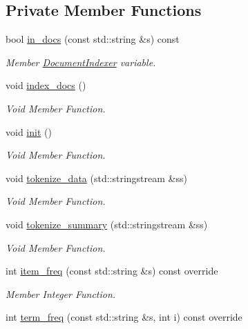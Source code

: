 \subsection*{Private Member Functions}
\begin{DoxyCompactItemize}
\item 
bool \hyperlink{class_movie_indexer_a70273bfe03449ef11fa2515eb1566959}{in\+\_\+docs} (const std\+::string \&s) const
\begin{DoxyCompactList}\small\item\em Member \hyperlink{class_document_indexer}{Document\+Indexer} variable. \end{DoxyCompactList}\item 
void \hyperlink{class_movie_indexer_a0fe5cadd54679e3404b47cebee62eebf}{index\+\_\+docs} ()
\begin{DoxyCompactList}\small\item\em Void Member Function. \end{DoxyCompactList}\item 
void \hyperlink{class_movie_indexer_a26ea53a1f47d8faa54a6289cda606003}{init} ()
\begin{DoxyCompactList}\small\item\em Void Member Function. \end{DoxyCompactList}\item 
void \hyperlink{class_movie_indexer_a21e8c7c3da12f8704e36b727cd530658}{tokenize\+\_\+data} (std\+::stringstream \&ss)
\begin{DoxyCompactList}\small\item\em Void Member Function. \end{DoxyCompactList}\item 
void \hyperlink{class_movie_indexer_a05be20f1dfeef59432c4310c633b41ec}{tokenize\+\_\+summary} (std\+::stringstream \&ss)
\begin{DoxyCompactList}\small\item\em Void Member Function. \end{DoxyCompactList}\item 
int \hyperlink{class_movie_indexer_ac19449df057ce8f16490bc42adab2b3c}{item\+\_\+freq} (const std\+::string \&s) const override
\begin{DoxyCompactList}\small\item\em Member Integer Function. \end{DoxyCompactList}\item 
int \hyperlink{class_movie_indexer_a4bba45f6f42bbbfb88a5f7d6aa56d0b3}{term\+\_\+freq} (const std\+::string \&s, int i) const override

\end{DoxyCompactItemize}

